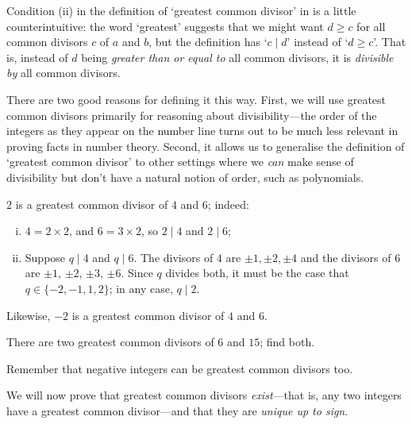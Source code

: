 Condition (ii) in the definition of `greatest common divisor' in  is a little counterintuitive: the word `greatest' suggests that we might want $d \ge c$ for all common divisors $c$ of $a$ and $b$, but the definition has `$c \mid d$' instead of `$d \ge c$'. That is, instead of $d$ being \textit{greater than or equal to} all common divisors, it is \textit{divisible by} all common divisors.

There are two good reasons for defining it this way. First, we will use greatest common divisors primarily for reasoning about divisibility---the order of the integers as they appear on the number line turns out to be much less relevant in proving facts in number theory. Second, it allows us to generalise the definition of `greatest common divisor' to other settings where we \textit{can} make sense of divisibility but don't have a natural notion of order, such as polynomials.

\begin{example}
\label{exGCDsOfFourAndSix}
$2$ is a greatest common divisor of $4$ and $6$; indeed:
\begin{enumerate}[(i)]
\item $4 = 2 \times 2$, and $6 = 3 \times 2$, so $2 \mid 4$ and $2 \mid 6$;
\item Suppose $q \mid 4$ and $q \mid 6$. The divisors of $4$ are $\pm 1, \pm 2, \pm 4$ and the divisors of $6$ are $\pm 1$, $\pm 2$, $\pm 3$, $\pm 6$. Since $q$ divides both, it must be the case that $q \in \{ {-2}, {-1}, 1, 2 \}$; in any case, $q \mid 2$.
\end{enumerate}
Likewise, $-2$ is a greatest common divisor of $4$ and $6$.
\end{example}

\begin{exercise}
\label{exGCDofSixAndFifteen}
There are two greatest common divisors of $6$ and $15$; find both.
\begin{backhint}
Remember that negative integers can be greatest common divisors too.
\end{backhint}
\end{exercise}

We will now prove that greatest common divisors \textit{exist}---that is, any two integers have a greatest common divisor---and that they are \textit{unique up to sign}.

